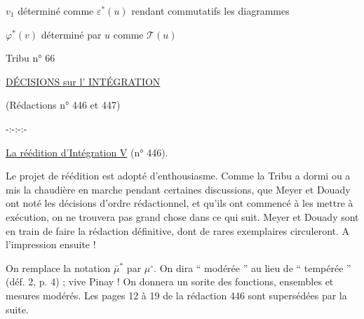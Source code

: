 $v_1$ déterminé comme $\varepsilon^*(u)$ \qquad rendant commutatifs les diagrammes

$\varphi^*(v)$ déterminé par $u$ comme $\mathcal T(u)$


Tribu n° 66

\uline{DÉCISIONS sur l' INTÉGRATION}

(Rédactions n° 446 et 447)

\mbox{-:-:-:-}

\uline{La réédition d'Intégration V} (n° 446).

Le projet de réédition est adopté d'enthousiasme. Comme la Tribu a dormi ou a mis la chaudière en marche pendant certaines discussions, que Meyer et Douady ont noté les décisions d'ordre rédactionnel, et qu'ils ont commencé à les mettre à exécution, on ne trouvera pas grand chose dans ce qui suit. Meyer et Douady sont en train de faire la rédaction définitive, dont de rares exemplaires circuleront. A l'impression ensuite !

On remplace la notation $\bar\mu^*$ par $\mu^\circ$. On dira `` modérée '' au lieu de `` tempérée '' (déf. 2, p. 4) ; vive Pinay ! On donnera un sorite des fonctions, ensembles et mesures modérés. Les pages 12 à 19 de la rédaction 446 sont supersédées par la suite.

